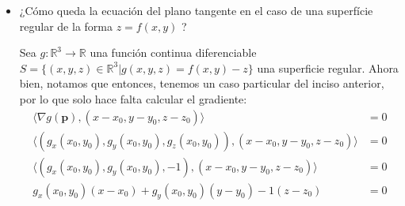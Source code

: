 \begin{problema}
\begin{sol}
    \end{sol}
    \begin{itemize}
        \item ¿Cómo queda la ecuación del plano tangente en el caso de una superfície regular de la forma $z=f(x, y)$ ?
        \begin{sol}
            Sea $g: \mathbb{R}^3 \to \mathbb{R}$ una función continua diferenciable  $S=\{(x,y,z)\in \mathbb{R}^3| g(x,y,z)=f(x,y)-z\}$ una superficie regular. Ahora bien, notamos que entonces, tenemos un caso particular del inciso anterior, por lo que solo hace falta calcular el gradiente: 
            \begin{align*}
               \langle \nabla g(\mathbf{p}), (x-x_0,y-y_0,z-z_0)\rangle &= 0\\
               \langle \left(g_x(x_0,y_0), g_y(x_0,y_0), g_z(x_0,y_0)\right), (x-x_0,y-y_0,z-z_0)\rangle &= 0\\
               \langle \left(g_x(x_0,y_0), g_y(x_0,y_0), -1\right), (x-x_0,y-y_0,z-z_0)\rangle &= 0\\
               g_x(x_0,y_0)(x-x_0)+g_y(x_0,y_0)(y-y_0)-1(z-z_0) &=0
            \end{align*}
        \end{sol}
    \end{itemize}

\end{problema}

